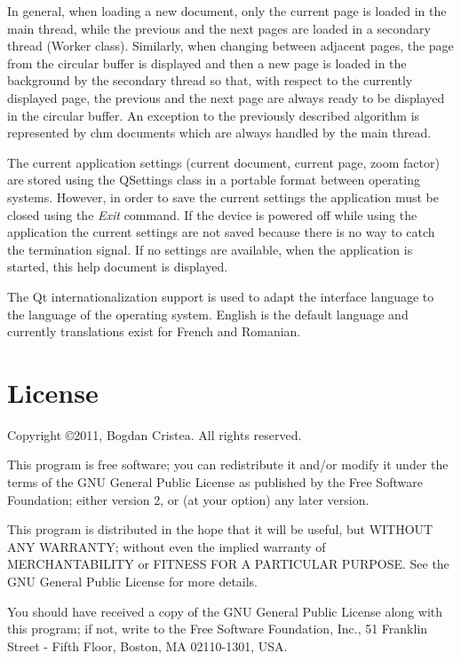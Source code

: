 \documentclass[journal,12pt]{IEEEtran}
\begin{document}
In general, when loading a new document, only the current page is loaded in the main thread, while the previous and the next pages are loaded in a secondary thread (\textrm{Worker} class). Similarly, when changing between adjacent pages, the page from the circular buffer is displayed and then a new page is loaded in the background by the secondary thread so that, with respect to the currently displayed page, the previous and the next page are always ready to be displayed in the circular buffer. An exception to the previously described algorithm is represented by chm documents which are always handled by the main thread.

The current application settings (current document, current page, zoom factor) are stored using the \textrm{QSettings} class in a portable format between operating systems. However, in order to save the current settings the application must be closed using the \textit{Exit} command. If the device is powered off while using the application the current settings are not saved because there is no way to catch the termination signal. If no settings are available, when the application is started, this help document is displayed.

The Qt internationalization support is used to adapt the interface language to the language of the operating system. English is the default language and currently translations exist for French and Romanian.

\section{License}
 Copyright \copyright 2011, Bogdan Cristea. All rights reserved.
 
 This program is free software; you can redistribute it and/or modify  it under the terms of the GNU General Public License as published by  the Free Software Foundation; either version 2, or (at your option)  any later version.
 
 This program is distributed in the hope that it will be useful,  but WITHOUT ANY WARRANTY; without even the implied warranty of
 MERCHANTABILITY or FITNESS FOR A PARTICULAR PURPOSE.  See the  GNU General Public License for more details.
 
 You should have received a copy of the GNU General Public License along with this program; if not, write to the Free Software
 Foundation, Inc., 51 Franklin Street - Fifth Floor, Boston, MA 02110-1301, USA.
\end{document}
